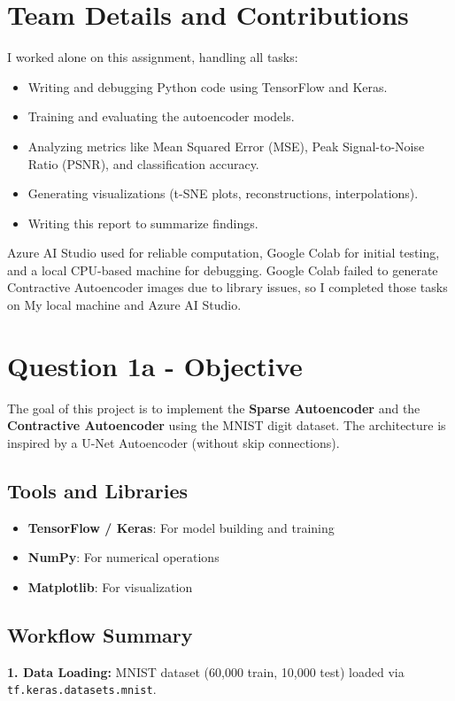 \documentclass[12pt]{article}
\begin{document}
	\section{Team Details and Contributions}
	I worked alone on this assignment, handling all tasks:
	\begin{itemize}
		\item Writing and debugging Python code using TensorFlow and Keras.
		\item Training and evaluating the autoencoder models.
		\item Analyzing metrics like Mean Squared Error (MSE), Peak Signal-to-Noise Ratio (PSNR), and classification accuracy.
		\item Generating visualizations (t-SNE plots, reconstructions, interpolations).
		\item Writing this report to summarize findings.
	\end{itemize}
	Azure AI Studio used for reliable computation, Google Colab for initial testing, and a local CPU-based machine for debugging. Google Colab failed to generate Contractive Autoencoder images due to library issues, so I completed those tasks on My local machine and Azure AI Studio.
	

\section*{Question 1a - Objective}
The goal of this project is to implement the \textbf{Sparse Autoencoder} and the \textbf{Contractive Autoencoder} using the MNIST digit dataset. The architecture is inspired by a U-Net Autoencoder (without skip connections).

\subsection*{Tools and Libraries}
\begin{itemize}
  \item \textbf{TensorFlow / Keras}: For model building and training
  \item \textbf{NumPy}: For numerical operations
  \item \textbf{Matplotlib}: For visualization
\end{itemize}

\subsection*{Workflow Summary}
\textbf{1. Data Loading:} MNIST dataset (60,000 train, 10,000 test) loaded via \texttt{tf.keras.datasets.mnist}.
\end{document}
